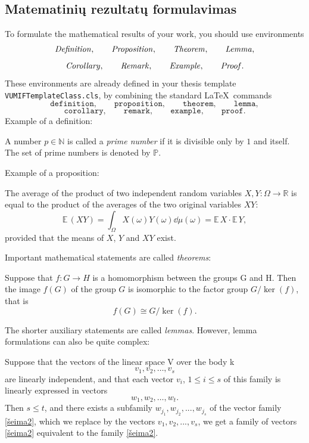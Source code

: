 \documentclass[]{VUMIFTemplateClass}
\newcommand{\EE}{\mathbb{E}\,} %
\begin{document}
\subsection{Matematinių rezultatų formulavimas}

To formulate the mathematical results of your work, you should use environments
\[
\text{\emph{Definition}},\qquad \text{\emph{Proposition}}, \qquad \text{\emph{Theorem}}, \qquad \text{\emph{Lemma}},
\]
\[
\text{\emph{Corollary}}, \qquad \text{\emph{Remark}}, \qquad  \text{\emph{Example}}, \qquad \text{\emph{Proof}}.
\]
These environments are already defined
in your thesis template \texttt{VUMIFTemplateClass.cls}, by combining the standard \LaTeX\ commands
\[
\texttt{definition}, \qquad \texttt{proposition}, \qquad \texttt{theorem}, \qquad \texttt{lemma},
\]
\[
\texttt{corollary}, \qquad \texttt{remark}, \qquad \texttt{example}, \qquad \texttt{proof}.
\]
\noindent Example of a definition:
\begin{definition}
A number $p \in \mathbb{N}$ is called a \emph{prime number} if it is divisible only by $1$ and itself. The set of prime numbers is denoted by $\mathbb{P}$.
\end{definition}
\noindent Example of a proposition:
\begin{proposition}
The average of the product of two independent random variables $X, Y: \Omega \to \mathbb{R}$ is equal to the product of the averages of the two original variables $XY$:
\[
\EE{(XY)}=\int_{\Omega} X(\omega)Y(\omega)\dd\mu(\omega) = \EE{X} \cdot \EE{Y},
\]
provided that the means of $X$, $Y$ and $XY$ exist.
\end{proposition}

\noindent  Important mathematical statements are called \emph{theorems}:
\begin{theorem}\label{teor1}
    Suppose that $f: G {\rightarrow} H$ is a homomorphism between the groups G and H. Then the image $f(G)$ of the group $G$ is isomorphic to the factor group $G / \ker{(f)}$, that is
    \[
        f(G) \cong G \big / \ker{(f)}.
    \]
\end{theorem}

\noindent The shorter auxiliary statements are called \emph{lemmas}. However, lemma formulations can also be quite complex:
\begin{lemma}\label{lem1}
    Suppose that the vectors of the linear space V over the body k
    \begin{equation}\label{šeima1}
        v_1, v_2, \dots, v_s
    \end{equation}
    are linearly independent, and that each vector $v_i$, $1 \leq i \leq s$ of this family is linearly expressed in vectors
    \begin{equation}\label{šeima2}
        w_1, w_2, \dots, w_t.
    \end{equation}
    Then $s \leq t$, and there exists a subfamily $w_{j_1}, w_{j_2}, . . . , w_{j_s}$ of the vector family \eqref{šeima2}, which we replace by the vectors $v_1, v_2, . . . , v_s$, we get a family of vectors \eqref{šeima2} equivalent to the family \eqref{šeima2}.
\end{lemma}
\end{document}
